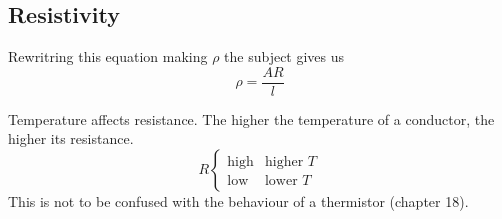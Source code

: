 \documentclass[../main.tex]{subfiles}
\begin{document}
	\subsection{Resistivity}
	Rewritring this equation making \(\rho\) the subject gives us 
	\[
		\rho = \frac{AR}{l}
	\]
	
	Temperature affects resistance. The higher the temperature of a conductor, the higher its resistance.
	\[
	R \begin{cases}
		\text{high} & \text{higher \(T\)} \\
		\text{low} 	& \text{lower \(T\)}
	\end{cases}
	\]
	This is not to be confused with the behaviour of a thermistor (chapter 18).
\end{document}
